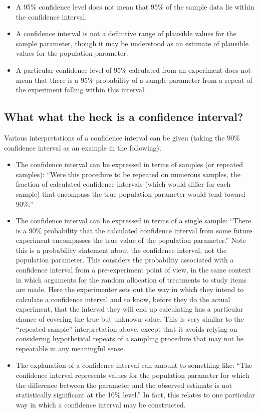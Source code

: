 \documentclass{tufte-handout}\usepackage[]{graphicx}\usepackage[]{color}
\begin{document}
\begin{itemize}
  \item A 95\% confidence level does not mean that 95\% of the sample data lie within the confidence interval.
  \item A confidence interval is not a definitive range of plausible values for the sample parameter, though it may be understood as an estimate of plausible values for the population parameter.
  \item A particular confidence level of 95\% calculated from an experiment does not mean that there is a 95\% probability of a sample parameter from a repeat of the experiment falling within this interval.
\end{itemize}

\subsection{What what the heck is a confidence interval?}

Various interpretations of a confidence interval can be given (taking the 90\% confidence interval as an example in the following).

\begin{itemize}
  \item The confidence interval can be expressed in terms of samples (or repeated samples): ``Were this procedure to be repeated on numerous samples, the fraction of calculated confidence intervals (which would differ for each sample) that encompass the true population parameter would tend toward 90\%.''

  \item The confidence interval can be expressed in terms of a single sample: ``There is a 90\% probability that the calculated confidence interval from some future experiment encompasses the true value of the population parameter.'' Note this is a probability statement about the confidence interval, not the population parameter. This considers the probability associated with a confidence interval from a pre-experiment point of view, in the same context in which arguments for the random allocation of treatments to study items are made. Here the experimenter sets out the way in which they intend to calculate a confidence interval and to know, before they do the actual experiment, that the interval they will end up calculating has a particular chance of covering the true but unknown value. This is very similar to the ``repeated sample'' interpretation above, except that it avoids relying on considering hypothetical repeats of a sampling procedure that may not be repeatable in any meaningful sense.

  \item The explanation of a confidence interval can amount to something like: ``The confidence interval represents values for the population parameter for which the difference between the parameter and the observed estimate is not statistically significant at the 10\% level.'' In fact, this relates to one particular way in which a confidence interval may be constructed.

\end{itemize}
\end{document}
